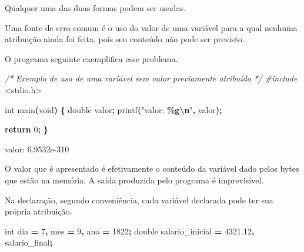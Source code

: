 \documentclass[
  11pt,
  a4paper,
]{scrbook}
\newenvironment{Shaded}{\begin{snugshade}}{\end{snugshade}}
\newcommand{\CommentTok}[1]{\textcolor[rgb]{0.56,0.35,0.01}{\textit{#1}}}
\newcommand{\ControlFlowTok}[1]{\textcolor[rgb]{0.13,0.29,0.53}{\textbf{#1}}}
\newcommand{\DataTypeTok}[1]{\textcolor[rgb]{0.13,0.29,0.53}{#1}}
\newcommand{\DecValTok}[1]{\textcolor[rgb]{0.00,0.00,0.81}{#1}}
\newcommand{\FloatTok}[1]{\textcolor[rgb]{0.00,0.00,0.81}{#1}}
\newcommand{\ImportTok}[1]{#1}
\newcommand{\NormalTok}[1]{#1}
\newcommand{\OperatorTok}[1]{\textcolor[rgb]{0.81,0.36,0.00}{\textbf{#1}}}
\newcommand{\PreprocessorTok}[1]{\textcolor[rgb]{0.56,0.35,0.01}{\textit{#1}}}
\newcommand{\SpecialCharTok}[1]{\textcolor[rgb]{0.81,0.36,0.00}{\textbf{#1}}}
\newcommand{\StringTok}[1]{\textcolor[rgb]{0.31,0.60,0.02}{#1}}
\begin{document}
Qualquer uma das duas formas podem ser usadas.

\begin{tcolorbox}[enhanced jigsaw, arc=.35mm, bottomtitle=1mm, colbacktitle=quarto-callout-tip-color!10!white, title=\textcolor{quarto-callout-tip-color}{\faLightbulb}\hspace{0.5em}{Dica}, toprule=.15mm, left=2mm, opacityback=0, colback=white, colframe=quarto-callout-tip-color-frame, opacitybacktitle=0.6, bottomrule=.15mm, leftrule=.75mm, toptitle=1mm, coltitle=black, titlerule=0mm, rightrule=.15mm, breakable]

Uma fonte de erro comum é o uso do valor de uma variável para a qual
nenhuma atribuição ainda foi feita, pois seu conteúdo não pode ser
previsto.

O programa seguinte exemplifica esse problema.

\begin{Shaded}
\begin{Highlighting}[]
\CommentTok{/* }
\CommentTok{Exemplo de uso de uma variável sem valor previamente atribuído}
\CommentTok{*/}
\PreprocessorTok{\#include }\ImportTok{\textless{}stdio.h\textgreater{}}

\DataTypeTok{int}\NormalTok{ main}\OperatorTok{(}\DataTypeTok{void}\OperatorTok{)} \OperatorTok{\{}
    \DataTypeTok{double}\NormalTok{ valor}\OperatorTok{;}
\NormalTok{    printf}\OperatorTok{(}\StringTok{"valor: }\SpecialCharTok{\%g\textbackslash{}n}\StringTok{"}\OperatorTok{,}\NormalTok{ valor}\OperatorTok{);}

    \ControlFlowTok{return} \DecValTok{0}\OperatorTok{;}
\OperatorTok{\}}
\end{Highlighting}
\end{Shaded}

\begin{Shaded}
\begin{Highlighting}[]
\NormalTok{valor: 6.9532e{-}310}
\end{Highlighting}
\end{Shaded}

O valor que é apresentado é efetivamente o conteúdo da variável dado
pelos bytes que estão na memória. A saída produzida pelo programa é
imprevisível.

\end{tcolorbox}

Na declaração, segundo conveniência, cada variável declarada pode ter
sua própria atribuição.

\begin{Shaded}
\begin{Highlighting}[]
\DataTypeTok{int}\NormalTok{ dia }\OperatorTok{=} \DecValTok{7}\OperatorTok{,}\NormalTok{ mes }\OperatorTok{=} \DecValTok{9}\OperatorTok{,}\NormalTok{ ano }\OperatorTok{=} \DecValTok{1822}\OperatorTok{;}
\DataTypeTok{double}\NormalTok{ salario\_inicial }\OperatorTok{=} \FloatTok{4321.12}\OperatorTok{,}\NormalTok{ salario\_final}\OperatorTok{;}
\end{Highlighting}
\end{Shaded}
\end{document}
